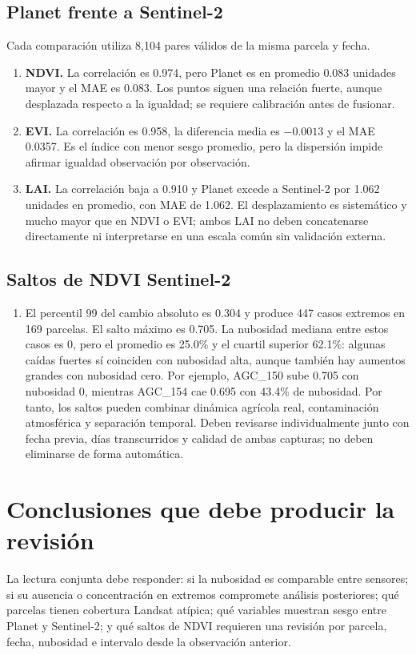 ﻿\documentclass[11pt,a4paper]{article}
\begin{document}
\subsection{Planet frente a Sentinel-2}
Cada comparación utiliza 8,104 pares válidos de la misma parcela y fecha.
\begin{enumerate}[resume]
  \item \textbf{NDVI.} La correlación es 0.974, pero Planet es en promedio 0.083
  unidades mayor y el MAE es 0.083. Los puntos siguen una relación fuerte, aunque
  desplazada respecto a la igualdad; se requiere calibración antes de fusionar.

  \item \textbf{EVI.} La correlación es 0.958, la diferencia media es $-0.0013$
  y el MAE 0.0357. Es el índice con menor sesgo promedio, pero la dispersión
  impide afirmar igualdad observación por observación.

  \item \textbf{LAI.} La correlación baja a 0.910 y Planet excede a Sentinel-2
  por 1.062 unidades en promedio, con MAE de 1.062. El desplazamiento es
  sistemático y mucho mayor que en NDVI o EVI; ambos LAI no deben concatenarse
  directamente ni interpretarse en una escala común sin validación externa.
\end{enumerate}

\subsection{Saltos de NDVI Sentinel-2}
\begin{enumerate}[resume]
  \item El percentil 99 del cambio absoluto es 0.304 y produce 447 casos
  extremos en 169 parcelas. El salto máximo es 0.705. La nubosidad mediana entre
  estos casos es 0, pero el promedio es 25.0\% y el cuartil superior 62.1\%:
  algunas caídas fuertes sí coinciden con nubosidad alta, aunque también hay
  aumentos grandes con nubosidad cero. Por ejemplo, AGC\_150 sube 0.705 con
  nubosidad 0, mientras AGC\_154 cae 0.695 con 43.4\% de nubosidad. Por tanto,
  los saltos pueden combinar dinámica agrícola real, contaminación atmosférica
  y separación temporal. Deben revisarse individualmente junto con fecha previa,
  días transcurridos y calidad de ambas capturas; no deben eliminarse de forma
  automática.
\end{enumerate}

\section{Conclusiones que debe producir la revisión}
La lectura conjunta debe responder: si la nubosidad es comparable entre sensores;
si su ausencia o concentración en extremos compromete análisis posteriores; qué
parcelas tienen cobertura Landsat atípica; qué variables muestran sesgo entre
Planet y Sentinel-2; y qué saltos de NDVI requieren una revisión por parcela,
fecha, nubosidad e intervalo desde la observación anterior.
\end{document}
